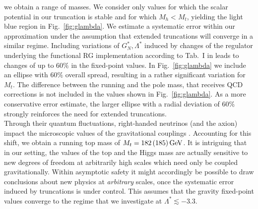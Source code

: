 \documentclass[%
 reprint,
 superscriptaddress,
preprintnumbers,
nofootinbib,
 amsmath,amssymb,
 aps,
prl,
]{revtex4-1}
\begin{document}
we obtain a range of masses. We consider only values for which the scalar potential in our truncation is stable and for which $M_h<M_t$, yielding the light blue region in Fig.~\ref{fig:glambda}. 
We estimate a systematic error within our approximation under the assumption that extended truncations will converge in a similar regime. Including variations of $G_N^{\ast}, \Lambda^{\ast}$ induced by changes of the regulator underlying the functional RG implementation according to Tab.~I in \cite{Dona:2013qba} leads to changes of up to $60\%$ in the fixed-point values. In Fig.~\ref{fig:glambda} we include an ellipse with $60\%$ overall spread, resulting in a rather significant variation for $M_t$. 
The difference between the running and the pole mass, that receives QCD corrections \cite{Hempfling:1994ar,Buttazzo:2013uya} is not included in the values shown in Fig.~\ref{fig:glambda}. As a more conservative error estimate, the larger ellipse with a radial deviation of $60\%$ strongly reinforces the need for extended truncations.
\\
\noindent 
Through their quantum fluctuations, right-handed neutrinos (and the axion) impact the microscopic values of the gravitational couplings \cite{Dona:2013qba}. Accounting for this shift, we obtain a running top mass of $ M_t = 182\, ( 185
)\, \rm GeV$. It is intriguing that in our setting, the values of the top and the Higgs mass are actually sensitive to new degrees of freedom at arbitrarily high scales which need only be coupled gravitationally. Within asymptotic safety it might accordingly be possible to draw conclusions about new physics at \emph{arbitrary} scales, once the systematic error induced by truncations is under control. This assumes that the gravity fixed-point values converge to the regime that we investigate at $\Lambda^{\ast}\lesssim-3.3$.
\\
\end{document}
